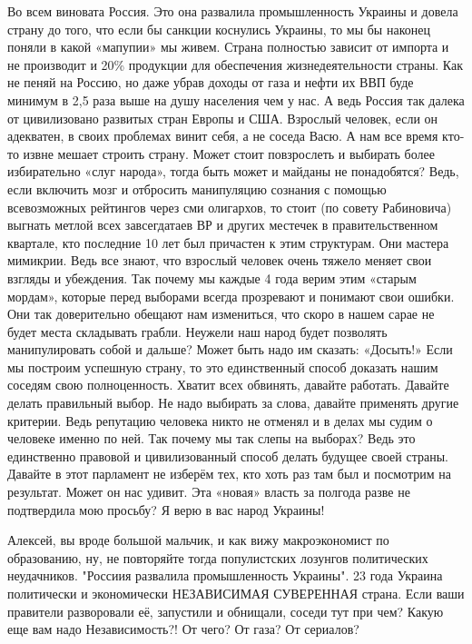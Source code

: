 \begin{itemize}
Во всем виновата Россия. Это она развалила промышленность Украины и довела
страну до того, что если бы санкции коснулись Украины, то мы бы наконец поняли
в какой «мапупии» мы живем. Страна полностью зависит от импорта и не производит
и 20\% продукции для обеспечения жизнедеятельности страны. Как не пеняй на
Россию, но даже убрав доходы от газа и нефти их ВВП буде минимум в 2,5 раза
выше на душу населения чем у нас. А ведь Россия так далека от цивилизовано
развитых стран Европы и США. Взрослый человек, если он адекватен, в своих
проблемах винит себя, а не соседа Васю. А нам все время кто-то извне мешает
строить страну. Может стоит повзрослеть и выбирать более избирательно «слуг
народа», тогда быть может и майданы не понадобятся? Ведь, если включить мозг и
отбросить манипуляцию сознания с помощью всевозможных рейтингов через сми
олигархов, то стоит (по совету Рабиновича) выгнать метлой всех завсегдатаев ВР
и других местечек в правительственном квартале, кто последние 10 лет был
причастен к этим структурам. Они мастера мимикрии. Ведь все знают, что взрослый
человек очень тяжело меняет свои взгляды и убеждения. Так почему мы каждые 4
года верим этим «старым мордам», которые перед выборами всегда прозревают и
понимают свои ошибки. Они так доверительно обещают нам измениться, что скоро в
нашем сарае не будет места складывать грабли. Неужели наш народ будет позволять
манипулировать собой и дальше? Может быть надо им сказать: «Досыть!» Если мы
построим успешную страну, то это единственный способ доказать нашим соседям
свою полноценность. Хватит всех обвинять, давайте работать. Давайте делать
правильный выбор. Не надо выбирать за слова, давайте применять другие критерии.
Ведь репутацию человека никто не отменял и в делах мы судим о человеке именно
по ней. Так почему мы так слепы на выборах? Ведь это единственно правовой и
цивилизованный способ делать будущее своей страны. Давайте в этот парламент не
изберём тех, кто хоть раз там был и посмотрим на результат. Может он нас
удивит. Эта «новая» власть за полгода разве не подтвердила мою просьбу? Я верю
в вас народ Украины!


Алексей, вы вроде большой мальчик, и как вижу макроэкономист по образованию,
ну, не повторяйте тогда популистских лозунгов политических неудачников.
"Россиия развалила промышленность Украины". 23 года Украина политически и
экономически НЕЗАВИСИМАЯ СУВЕРЕННАЯ страна. Если ваши правители разворовали её,
запустили и обнищали, соседи тут при чем? Какую еще вам надо Независимость?! От
чего? От газа? От сериалов?


\end{itemize}
